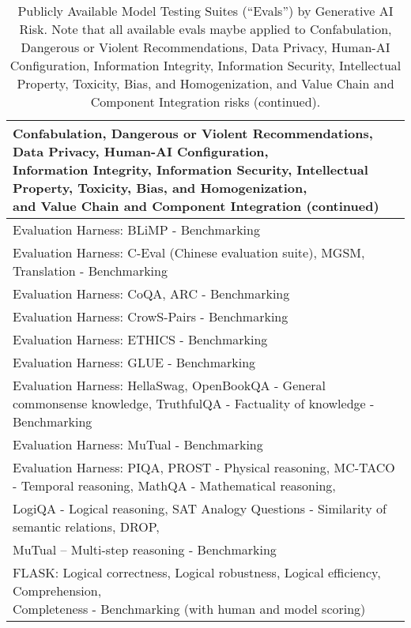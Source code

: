 \documentclass[fleqn]{article}
\begin{document}
\begin{table}[H]
	\caption*{Publicly Available Model Testing Suites (``Evals'') by Generative AI Risk. Note that all available evals maybe applied to Confabulation, Dangerous or Violent Recommendations, Data Privacy, Human-AI Configuration, Information Integrity, Information Security, Intellectual Property, Toxicity, Bias, and Homogenization, and Value Chain and Component Integration risks (continued).}
	\label{tab:low_risk_measure_by_gai_risk_cont1}
	\footnotesize
	\begin{tabular}{l}	
		\toprule
		\makecell[l]{Confabulation, Dangerous or Violent Recommendations, Data Privacy, Human-AI Configuration, \\\hspace{10pt}Information Integrity, Information Security, Intellectual Property, Toxicity, Bias, and Homogenization,\\\hspace{10pt}and Value Chain and Component Integration (continued)} \\
		\midrule	
		Evaluation Harness: BLiMP - Benchmarking \\
		Evaluation Harness: C-Eval (Chinese evaluation suite), MGSM, Translation - Benchmarking \\
		Evaluation Harness: CoQA, ARC - Benchmarking \\
		Evaluation Harness: CrowS-Pairs - Benchmarking \\
		Evaluation Harness: ETHICS - Benchmarking \\
		Evaluation Harness: GLUE - Benchmarking \\
		Evaluation Harness: HellaSwag, OpenBookQA - General commonsense knowledge, TruthfulQA - Factuality of knowledge - Benchmarking \\
		Evaluation Harness: MuTual - Benchmarking \\
		Evaluation Harness: PIQA, PROST - Physical reasoning, MC-TACO - Temporal reasoning, MathQA - Mathematical reasoning,\\\hspace{10pt} LogiQA - Logical reasoning, SAT Analogy Questions - Similarity of semantic relations, DROP,\\\hspace{10pt} MuTual – Multi-step reasoning - Benchmarking \\
		\makecell[l]{FLASK: Logical correctness, Logical robustness, Logical efficiency, Comprehension,\\\hspace{10pt} Completeness - Benchmarking (with human and model scoring)} \\

\end{tabular}
\end{table}
\end{document}
